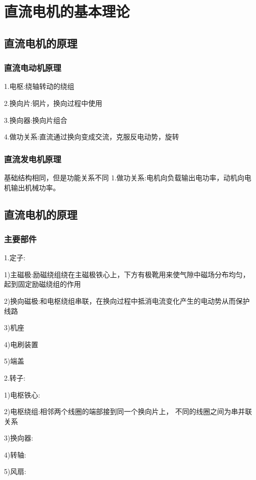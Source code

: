 \documentclass[11pt,twoside,a4paper]{ctexart}
\begin{document}
    \section{直流电机的基本理论}
    \subsection{直流电机的原理}
    \subsubsection{直流电动机原理}

    1.电枢:绕轴转动的绕组

    2.换向片:铜片，换向过程中使用

    3.换向器:换向片组合

    4.做功关系:直流通过换向变成交流，克服反电动势，旋转
    \subsubsection{直流发电机原理}
    基础结构相同，但是功能关系不同
    1.做功关系:电机向负载输出电功率，动机向电机输出机械功率。
    \subsection{直流电机的原理}
    \subsubsection{主要部件}
    1.定子:
    \begin{minipage}[t]{0.9\linewidth}
        1)主磁极:励磁绕组绕在主磁极铁心上，下方有极靴用来使气隙中磁场分布均匀，起到固定励磁绕组的作用

        2)换向磁极:和电枢绕组串联，在换向过程中抵消电流变化产生的电动势从而保护线路

        3)机座

        4)电刷装置

        5)端盖
    \end{minipage}

    2.转子:
    \begin{minipage}[t]{0.9\linewidth}
        1)电枢铁心:

        2)电枢绕组:相邻两个线圈的端部接到同一个换向片上，
        不同的线圈之间为串并联关系

        3)换向器:

        4)转轴:

        5)风扇:
    \end{minipage}
\end{document}
